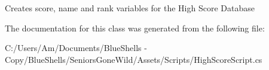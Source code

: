 Creates score, name and rank variables for the High Score Database 



The documentation for this class was generated from the following file\+:\begin{DoxyCompactItemize}
\item 
C\+:/\+Users/\+Am/\+Documents/\+Blue\+Shells -\/ Copy/\+Blue\+Shells/\+Seniors\+Gone\+Wild/\+Assets/\+Scripts/High\+Score\+Script.\+cs\end{DoxyCompactItemize}
